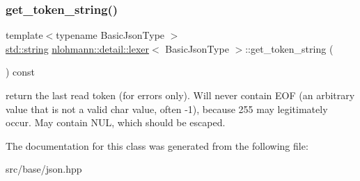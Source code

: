 \subsubsection{\texorpdfstring{get\+\_\+token\+\_\+string()}{get\_token\_string()}}
{\footnotesize\ttfamily template$<$typename Basic\+Json\+Type $>$ \\
\mbox{\hyperlink{namespacenlohmann_1_1detail_a1ed8fc6239da25abcaf681d30ace4985ab45cffe084dd3d20d928bee85e7b0f21}{std\+::string}} \mbox{\hyperlink{classnlohmann_1_1detail_1_1lexer}{nlohmann\+::detail\+::lexer}}$<$ Basic\+Json\+Type $>$\+::get\+\_\+token\+\_\+string (\begin{DoxyParamCaption}{ }\end{DoxyParamCaption}) const\hspace{0.3cm}{\ttfamily [inline]}}

return the last read token (for errors only). Will never contain E\+OF (an arbitrary value that is not a valid char value, often -\/1), because 255 may legitimately occur. May contain N\+UL, which should be escaped. 

The documentation for this class was generated from the following file\+:\begin{DoxyCompactItemize}
\item 
src/base/json.\+hpp\end{DoxyCompactItemize}
